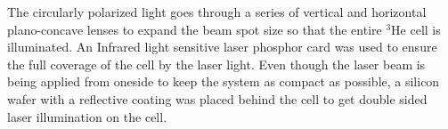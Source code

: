 
The circularly polarized light goes through a series of vertical and horizontal plano-concave lenses to expand the beam spot size so that the entire $^3$He cell is illuminated. An Infrared light sensitive laser phosphor card was used to ensure the full coverage of the cell by the laser light. Even though the laser beam is being applied from oneside to keep the system as compact as possible, a silicon wafer with a reflective coating was placed behind the cell to get double sided laser illumination on the cell.

%        
%

